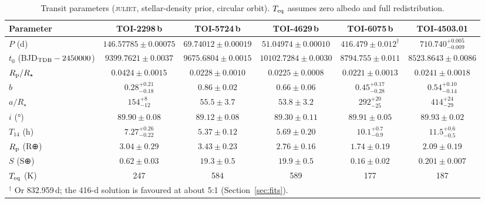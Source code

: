 \documentclass[fleqn,usenatbib]{mnras}
\newcommand{\Rp}{\ensuremath{R_{\rm p}}}
\begin{document}
\begin{table}
\centering
\caption{Transit parameters (\textsc{juliet}, stellar-density prior, circular orbit). $T_{\rm eq}$ assumes zero albedo and full redistribution.}
\label{tab:fits}
\small
\setlength{\tabcolsep}{4pt}
\begin{tabular}{lccccc}
\toprule
Parameter & TOI-2298\,b & TOI-5724\,b & TOI-4629\,b & TOI-6075\,b & TOI-4503.01 \\
\midrule
$P$ (d) & $146.57785 \pm 0.00075$ & $69.74012 \pm 0.00019$ & $51.04974 \pm 0.00010$ & $416.479 \pm 0.012^\dagger$ & $710.740^{+0.005}_{-0.009}$ \\
$t_0$ (BJD$_{\rm TDB} - 2450000$) & $9399.7621 \pm 0.0037$ & $9675.6804 \pm 0.0015$ & $10102.7284 \pm 0.0030$ & $8794.755 \pm 0.011$ & $8523.8643 \pm 0.0086$ \\
$\Rp/R_\star$ & $0.0424 \pm 0.0015$ & $0.0228 \pm 0.0010$ & $0.0225 \pm 0.0008$ & $0.0221 \pm 0.0013$ & $0.0241 \pm 0.0018$ \\
$b$ & $0.28^{+0.21}_{-0.18}$ & $0.86 \pm 0.02$ & $0.66 \pm 0.06$ & $0.45^{+0.17}_{-0.28}$ & $0.54^{+0.10}_{-0.14}$ \\
$a/R_\star$ & $154^{+8}_{-12}$ & $55.5 \pm 3.7$ & $53.8 \pm 3.2$ & $292^{+20}_{-25}$ & $414^{+24}_{-29}$ \\
$i$ (°) & $89.90 \pm 0.08$ & $89.12 \pm 0.08$ & $89.30 \pm 0.11$ & $89.91 \pm 0.05$ & $89.93 \pm 0.02$ \\
$T_{14}$ (h) & $7.27^{+0.26}_{-0.22}$ & $5.37 \pm 0.12$ & $5.69 \pm 0.20$ & $10.1^{+0.7}_{-0.9}$ & $11.5^{+0.6}_{-0.5}$ \\
$\Rp$ (R⊕) & $3.04 \pm 0.29$ & $3.43 \pm 0.23$ & $2.76 \pm 0.16$ & $1.74 \pm 0.19$ & $2.09 \pm 0.19$ \\
$S$ (S⊕) & $0.62 \pm 0.03$ & $19.3 \pm 0.5$ & $19.9 \pm 0.5$ & $0.16 \pm 0.02$ & $0.201 \pm 0.007$ \\
$T_{\rm eq}$ (K) & 247 & 584 & 589 & 177 & 187 \\
\bottomrule
\multicolumn{6}{l}{$^\dagger$ Or 832.959\,d; the 416-d solution is favoured at about 5:1 (Section~\ref{sec:fits}).}
\end{tabular}
\end{table}
\end{document}
